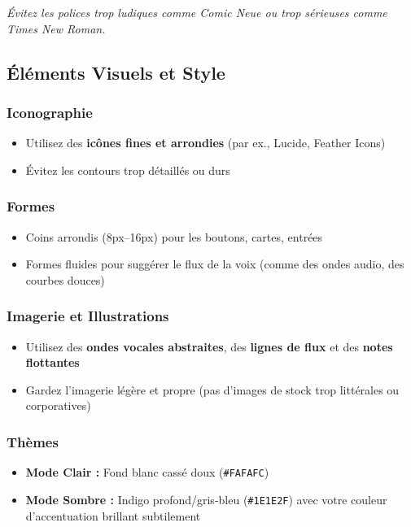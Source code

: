 \textit{Évitez les polices trop ludiques comme Comic Neue ou trop sérieuses comme Times New Roman.}

\subsection{Éléments Visuels et Style}

\subsubsection{Iconographie}

\begin{itemize}
    \item Utilisez des \textbf{icônes fines et arrondies} (par ex., Lucide, Feather Icons)
    \item Évitez les contours trop détaillés ou durs
\end{itemize}

\subsubsection{Formes}

\begin{itemize}
    \item Coins arrondis (8px–16px) pour les boutons, cartes, entrées
    \item Formes fluides pour suggérer le flux de la voix (comme des ondes audio, des courbes douces)
\end{itemize}

\subsubsection{Imagerie et Illustrations}

\begin{itemize}
    \item Utilisez des \textbf{ondes vocales abstraites}, des \textbf{lignes de flux} et des \textbf{notes flottantes}
    \item Gardez l'imagerie légère et propre (pas d'images de stock trop littérales ou corporatives)
\end{itemize}

\subsubsection{Thèmes}

\begin{itemize}
    \item \textbf{Mode Clair :} Fond blanc cassé doux (\texttt{\#FAFAFC})
    \item \textbf{Mode Sombre :} Indigo profond/gris-bleu (\texttt{\#1E1E2F}) avec votre couleur d'accentuation brillant subtilement
\end{itemize}

